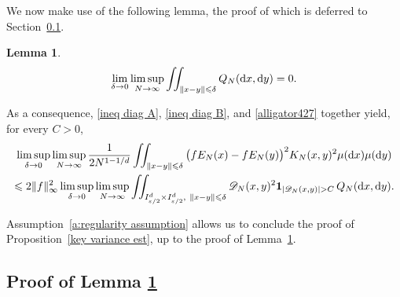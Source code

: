 \documentclass[a4paper,11pt]{article}
\numberwithin{equation}{section}
\newtheorem{lemma}[]{Lemma}
\theoremstyle{definition}
\newcommand{\eq}{\begin{equation}}
\newcommand{\qe}{\end{equation}}
\newcommand{\bv}{\mathbf}
\renewcommand{\leq}{\leqslant}
\renewcommand{\epsilon}{\varepsilon}
\renewcommand{\d}{ {\rm d}}
\begin{document}
We now make use of the following lemma, the proof of which is deferred to Section~\ref{s:lemmaProof}.
 \begin{lemma}
  \label{diagonal est}
   \eq
 \lim_{\delta\to0}\limsup_{N\to\infty} \iint_{\|x-y\|\leq \delta} Q_N(\d x,\d y)=0.
 \qe
\end{lemma}

As a consequence, \eqref{ineq diag A}, \eqref{ineq diag B}, and
\eqref{alligator427} together yield, for every $C>0$,
\begin{multline}
\limsup_{\delta\to 0}\limsup_{N\to\infty}\frac1{2N^{1-1/d}}\iint_{\|x-y\|\leq \delta} \big(fE_N(x)-fE_N(y)\big)^2K_N(x,y)^2\mu(\d x)\mu(\d y)\\
\leq 2\|f\|_\infty^2 \limsup_{\delta\to
  0}\limsup_{N\to\infty}\iint_{I^d_{\epsilon/2}\times I^d_{\epsilon/2},\
  \|x-y\|\leq \delta} \mathscr D_{N}(x,y)^2 \bv 1_{|\mathscr D_{N}(x,y)|> C} \,Q_N(\d x,\d y).
\end{multline}

Assumption~\ref{a:regularity assumption} allows us to conclude the proof of
Proposition~\ref{key variance est}, up to the proof of Lemma~\ref{diagonal est}.



\subsection{Proof of Lemma \ref{diagonal est}}
\label{s:lemmaProof}
\end{document}
